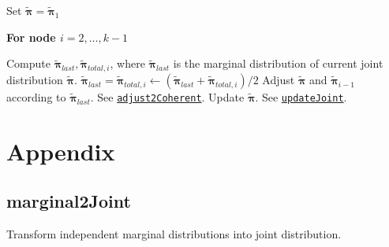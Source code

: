 \documentclass[12pt]{article}
\let\code=\texttt
\begin{document}
\vspace{10mm}
\noindent Set $\tilde{\boldsymbol{\pi}} = \tilde{\boldsymbol{\pi}}_{1}$

\noindent\textbf{For node $i=2,\dots,k-1$}


\begin{outline}[enumerate]
    \1 Compute $\tilde{\boldsymbol{\pi}}_{last}, \tilde{\boldsymbol{\pi}}_{total,i}$, where $\tilde{\boldsymbol{\pi}}_{last}$ is the marginal distribution of current joint distribution $\tilde{\boldsymbol{\pi}}$.
    \1 $\tilde {\boldsymbol{\pi}}_{last} = \tilde {\boldsymbol{\pi}}_{total, i} \leftarrow (\tilde{\boldsymbol{\pi}}_{last}+\tilde{\boldsymbol{\pi}}_{total,i})/2$
    \1 Adjust $\tilde {\boldsymbol{\pi}}$ and $\tilde {\boldsymbol{\pi}}_{i-1}$ according to $\tilde {\boldsymbol{\pi}}_{last}$. See \hyperref[adjust2Coherent]{\code{adjust2Coherent}}.
    \1 Update $\tilde{\boldsymbol{\pi}}$. See \hyperref[updateJoint]{\code{updateJoint}}.
\end{outline}








\section{Appendix}



\subsection{marginal2Joint}
\label{marginal2Joint}
Transform independent marginal distributions into joint distribution.
\end{document}
